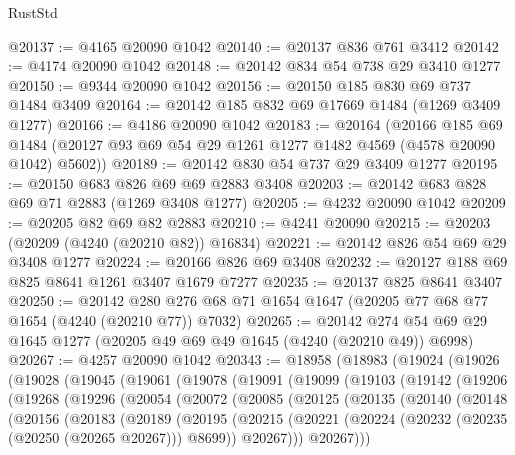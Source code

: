 \begin{lexlean}{RustStd}
\begin{coremodule}
@20137 := @4165 @20090 @1042
@20140 := @20137 @836 @761 @3412
@20142 := @4174 @20090 @1042
@20148 := @20142 @834 @54 @738 @29 @3410 @1277
@20150 := @9344 @20090 @1042
@20156 := @20150 @185 @830 @69 @737 @1484 @3409
@20164 := @20142 @185 @832 @69 @17669 @1484 (@1269 @3409 @1277)
@20166 := @4186 @20090 @1042
@20183 := @20164
    (@20166
      @185
      @69
      @1484
      (@20127 @93 @69 @54 @29 @1261 @1277 @1482 @4569 (@4578 @20090 @1042) @5602))
@20189 := @20142 @830 @54 @737 @29 @3409 @1277
@20195 := @20150 @683 @826 @69 @69 @2883 @3408
@20203 := @20142 @683 @828 @69 @71 @2883 (@1269 @3408 @1277)
@20205 := @4232 @20090 @1042
@20209 := @20205 @82 @69 @82 @2883
@20210 := @4241 @20090
@20215 := @20203 (@20209 (@4240 (@20210 @82)) @16834)
@20221 := @20142 @826 @54 @69 @29 @3408 @1277
@20224 := @20166 @826 @69 @3408
@20232 := @20127 @188 @69 @825 @8641 @1261 @3407 @1679 @7277
@20235 := @20137 @825 @8641 @3407
@20250 := @20142 @280 @276 @68 @71 @1654 @1647 (@20205 @77 @68 @77 @1654 (@4240 (@20210 @77)) @7032)
@20265 := @20142 @274 @54 @69 @29 @1645 @1277 (@20205 @49 @69 @49 @1645 (@4240 (@20210 @49)) @6998)
@20267 := @4257 @20090 @1042
@20343 := @18958
    (@18983
      (@19024
        (@19026
          (@19028
            (@19045
              (@19061
                (@19078
                  (@19091
                    (@19099
                      (@19103
                        (@19142
                          (@19206
                            (@19268
                              (@19296
                                (@20054
                                  (@20072
                                    (@20085
                                      (@20125
                                        (@20135
                                          (@20140
                                            (@20148
                                              (@20156
                                                (@20183
                                                  (@20189
                                                    (@20195
                                                      (@20215
                                                        (@20221
                                                          (@20224
                                                            (@20232
                                                              (@20235 (@20250 (@20265 @20267)))
                                                              @8699))
                                                          @20267)))
                                                    @20267)))

\end{coremodule}
\end{lexlean}
